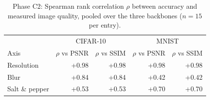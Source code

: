 \begin{table}[htbp]
\centering
\caption{Phase C2: Spearman rank correlation $\rho$ between accuracy and measured image quality, pooled over the three backbones ($n = 15$ per entry).}
\label{tab:c2_spearman}
\setlength{\tabcolsep}{6pt}
\renewcommand{\arraystretch}{1.1}
\begin{tabular}{lrrrr}
\toprule
 & \multicolumn{2}{c}{CIFAR-10} & \multicolumn{2}{c}{MNIST} \\
Axis & $\rho$ vs PSNR & $\rho$ vs SSIM & $\rho$ vs PSNR & $\rho$ vs SSIM \\
\midrule
Resolution & +0.98 & +0.98 & +0.98 & +0.98 \\
Blur & +0.84 & +0.84 & +0.42 & +0.42 \\
Salt \& pepper & +0.53 & +0.53 & +0.70 & +0.70 \\
\bottomrule
\end{tabular}
\end{table}
